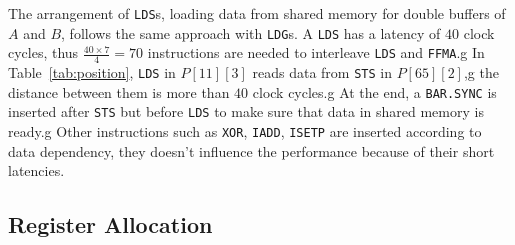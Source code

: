 The arrangement of {\tt LDS}s, loading data from shared memory for double buffers of $A$ and $B$, follows the same approach with {\tt LDG}s.
A {\tt LDS} has a latency of $40$ clock cycles, thus $\frac{40\times 7}{4}=70$ instructions are needed to interleave {\tt LDS} and {\tt FFMA}.g
In Table~\ref{tab:position}, {\tt LDS} in $P[11][3]$ reads data from {\tt STS} in $P[65][2]$,g
the distance between them is more than $40$ clock cycles.g
At the end, a {\tt BAR.SYNC} is inserted after {\tt STS} but before {\tt LDS} to make sure that data in shared memory is ready.g
Other instructions such as {\tt XOR}, {\tt IADD}, {\tt ISETP} are inserted according to data dependency, they doesn't influence the performance because of their short latencies.


\subsection{Register Allocation}

